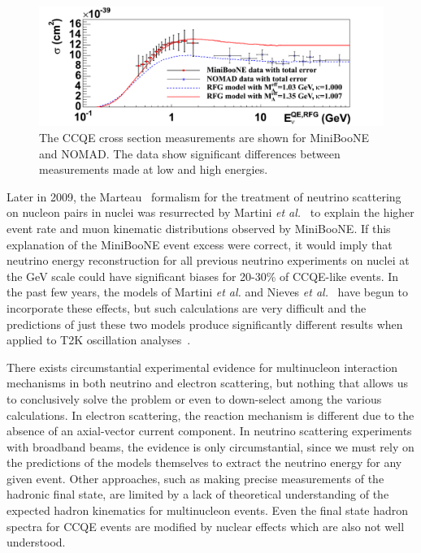 \begin{figure}[htpb]
     \begin{center}
       \includegraphics[width=15cm]{figures/sigma_sam.png}
       \caption{The CCQE cross section measurements are shown for MiniBooNE and NOMAD. The data show significant differences between measurements made at low and high energies.}
     \end{center}
\label{fig:miniboonenomad}
\end{figure}

Later in 2009, the Marteau~\cite{Marteau:1999kt} formalism for the treatment of neutrino scattering on nucleon 
pairs in nuclei was resurrected by Martini {\it et al.}~\cite{Martini:2009uj,Martini:2010ex,Martini:2011wp} to explain the
 higher event rate and muon kinematic distributions observed by MiniBooNE.  If this explanation of the MiniBooNE event 
excess were correct, it would imply that neutrino energy reconstruction for all previous neutrino experiments on nuclei
 at the GeV scale could have significant biases for 20-30\% of CCQE-like events. In the past few years, the models of Martini {\it et al.} and Nieves {\it et al.}~\cite{Nieves:2011pp} have begun to incorporate these effects, but such calculations are very difficult and the predictions of just these two models produce significantly different results when applied to T2K oscillation analyses~\cite{TN172}.
 
There exists circumstantial experimental evidence for multinucleon interaction mechanisms in both neutrino and electron scattering, but nothing that allows us to conclusively solve the problem or even to down-select among the various calculations.  In electron scattering, the reaction mechanism is different due to the absence of an axial-vector current component.  In neutrino scattering experiments with broadband beams, the evidence is only circumstantial, since we must rely on the predictions of the models themselves to extract the neutrino energy for any given event. Other approaches, such as making precise measurements of the hadronic final state, are limited by a lack of theoretical understanding of the expected hadron kinematics for multinucleon events. Even the final state hadron spectra for CCQE events are modified by nuclear effects which are also not well understood.


